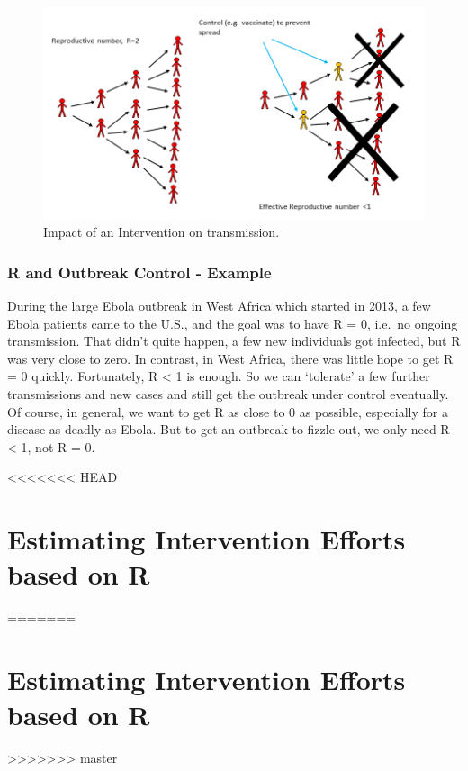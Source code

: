 \documentclass[]{book}
\theoremstyle{definition}
\theoremstyle{definition}
\theoremstyle{definition}
\theoremstyle{remark}
\begin{document}
\begin{figure}
\centering
\includegraphics{./images/R0intervention.png}
\caption{\label{fig:R0intervention}Impact of an Intervention on
transmission.}
\end{figure}

\hypertarget{myexamplebox}{%
\subsubsection{R and Outbreak Control - Example}\label{myexamplebox}}

During the large Ebola outbreak in West Africa which started in 2013, a
few Ebola patients came to the U.S., and the goal was to have R = 0,
i.e.~no ongoing transmission. That didn't quite happen, a few new
individuals got infected, but R was very close to zero. In contrast, in
West Africa, there was little hope to get R = 0 quickly. Fortunately, R
\textless{} 1 is enough. So we can `tolerate' a few further
transmissions and new cases and still get the outbreak under control
eventually. Of course, in general, we want to get R as close to 0 as
possible, especially for a disease as deadly as Ebola. But to get an
outbreak to fizzle out, we only need R \textless{} 1, not R = 0.

<<<<<<< HEAD
\hypertarget{estimating-intervention-efforts-based-on-r}{%
\section{Estimating Intervention Efforts based on
R}\label{estimating-intervention-efforts-based-on-r}}
=======
\section{Estimating Intervention Efforts based on
R}\label{estimating-intervention-efforts-based-on-r}
>>>>>>> master
\end{document}
